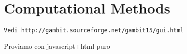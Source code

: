 \chapter{Computational Methods}

\begin{verbatim}
Vedi http://gambit.sourceforge.net/gambit15/gui.html
\end{verbatim}


Proviamo con javascript+html puro


